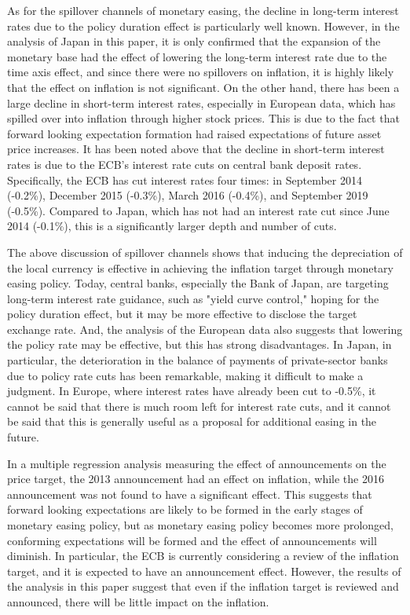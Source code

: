 \documentclass[12pt]{article}
\begin{document}
As for the spillover channels of monetary easing, the decline in long-term interest rates due to the policy duration effect is particularly well known.
However, in the analysis of Japan in this paper, it is only confirmed that the expansion of the monetary base had the effect of lowering the long-term interest rate due to the time axis effect, and since there were no spillovers on inflation, it is highly likely that the effect on inflation is not significant.
On the other hand, there has been a large decline in short-term interest rates, especially in European data, which has spilled over into inflation through higher stock prices.
This is due to the fact that forward looking expectation formation had raised expectations of future asset price increases.
It has been noted above that the decline in short-term interest rates is due to the ECB's interest rate cuts on central bank deposit rates.
Specifically, the ECB has cut interest rates four times: in September 2014 (-0.2\%), December 2015 (-0.3\%), March 2016 (-0.4\%), and September 2019 (-0.5\%).
Compared to Japan, which has not had an interest rate cut since June 2014 (-0.1\%), this is a significantly larger depth and number of cuts.

The above discussion of spillover channels shows that inducing the depreciation of the local currency is effective in achieving the inflation target through monetary easing policy.
Today, central banks, especially the Bank of Japan, are targeting long-term interest rate guidance, such as "yield curve control," hoping for the policy duration effect, but it may be more effective to disclose the target exchange rate.
And, the analysis of the European data also suggests that lowering the policy rate may be effective, but this has strong disadvantages.
In Japan, in particular, the deterioration in the balance of payments of private-sector banks due to policy rate cuts has been remarkable, making it difficult to make a judgment.
In Europe, where interest rates have already been cut to -0.5\%, it cannot be said that there is much room left for interest rate cuts, and it cannot be said that this is generally useful as a proposal for additional easing in the future.

In a multiple regression analysis measuring the effect of announcements on the price target, the 2013 announcement had an effect on inflation, while the 2016 announcement was not found to have a significant effect.
This suggests that forward looking expectations are likely to be formed in the early stages of monetary easing policy, but as monetary easing policy becomes more prolonged, conforming expectations will be formed and the effect of announcements will diminish.
In particular, the ECB is currently considering a review of the inflation target, and it is expected to have an announcement effect.
However, the results of the analysis in this paper suggest that even if the inflation target is reviewed and announced, there will be little impact on the inflation.
\end{document}
